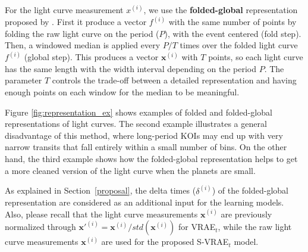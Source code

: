 For the light curve measurement $x^{(i)}$, we use the \textbf{folded-global} representation proposed by \citep{shallue2018identifying}. First it produce a vector $f^{(i)}$ with the same number of points by folding the raw light curve on the period ($P$), with the event centered (fold step). Then, a windowed median is applied every $P/T$ times over the folded light curve $f^{(i)}$ (global step). This produces a vector $\mathbf{x}^{(i)}$ with $T$ points, so each light curve has the same length with the width interval depending on the period $P$.
The parameter $T$ controls the trade-off between a detailed representation and having enough points on each window for the median to be meaningful.

Figure \ref{fig:representation_ex} shows examples of folded and folded-global representations of light curves.
The second example illustrates a general disadvantage of this method, where long-period KOIs may end up with very narrow transits that fall entirely within a small number of bins. On the other hand, the third example shows how the folded-global representation helps to get a more cleaned version of the light curve when the planets are small. 

As explained in Section~\ref{proposal}, the delta times ($\delta^{(i)}$) of the folded-global representation are considered as an additional input for the learning models. 
Also, please recall that the light curve measurements $\mathbf{x}^{(i)}$ are previously normalized through $\mathbf{x}'^{(i)} = \mathbf{x}^{(i)}/std(\mathbf{x}^{(i)})$ for VRAE$_t$,%
while the raw light curve measurements $\mathbf{x}^{(i)}$ are used for the proposed S-VRAE$_t$ model.



